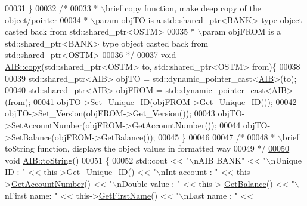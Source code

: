 \begin{DoxyCode}
00031 \}
00032 \textcolor{comment}{/*}
00033 \textcolor{comment}{ * \(\backslash\)brief copy function, make deep copy of the object/pointer}
00034 \textcolor{comment}{ * \(\backslash\)param objTO is a std::shared\_ptr<BANK> type object casted back from std::shared\_ptr<OSTM>}
00035 \textcolor{comment}{ * \(\backslash\)param objFROM is a std::shared\_ptr<BANK> type object casted back from std::shared\_ptr<OSTM>}
00036 \textcolor{comment}{ */}
\hypertarget{_a_i_b_8cpp_source.tex_l00037}{}\hyperlink{class_a_i_b_ad76f25ce86cb42028440f41c371903e0_ad76f25ce86cb42028440f41c371903e0}{00037} \textcolor{keywordtype}{void} \hyperlink{class_a_i_b_ad76f25ce86cb42028440f41c371903e0_ad76f25ce86cb42028440f41c371903e0}{AIB::copy}(std::shared\_ptr<OSTM> to, std::shared\_ptr<OSTM> from)\{
00038 
00039     std::shared\_ptr<AIB> objTO = std::dynamic\_pointer\_cast<\hyperlink{class_a_i_b}{AIB}>(to);
00040     std::shared\_ptr<AIB> objFROM = std::dynamic\_pointer\_cast<\hyperlink{class_a_i_b}{AIB}>(from);
00041     objTO->\hyperlink{class_o_s_t_m_ab5019a32185631c08abbf826422f2d93_ab5019a32185631c08abbf826422f2d93}{Set\_Unique\_ID}(objFROM->Get\_Unique\_ID());
00042     objTO->Set\_Version(objFROM->Get\_Version());
00043     objTO->SetAccountNumber(objFROM->GetAccountNumber());
00044     objTO->SetBalance(objFROM->GetBalance());
00045 \}
00046 
00047 \textcolor{comment}{/*}
00048 \textcolor{comment}{ *  \(\backslash\)brief toString function, displays the object values in formatted way}
00049 \textcolor{comment}{ */}
\hypertarget{_a_i_b_8cpp_source.tex_l00050}{}\hyperlink{class_a_i_b_aff0f0a0db75a17efec4bd500b888232d_aff0f0a0db75a17efec4bd500b888232d}{00050} \textcolor{keywordtype}{void} \hyperlink{class_a_i_b_aff0f0a0db75a17efec4bd500b888232d_aff0f0a0db75a17efec4bd500b888232d}{AIB::toString}()
00051 \{
00052     std::cout << \textcolor{stringliteral}{"\(\backslash\)nAIB BANK"} << \textcolor{stringliteral}{"\(\backslash\)nUnique ID : "} << this->\hyperlink{class_o_s_t_m_a5a01a8b98d16b1d1904ecf9356e7b71d_a5a01a8b98d16b1d1904ecf9356e7b71d}{Get\_Unique\_ID}() << \textcolor{stringliteral}{"\(\backslash\)nInt account :
       "} << this->\hyperlink{class_a_i_b_aef34bfbf20d767114e05b8b532cab777_aef34bfbf20d767114e05b8b532cab777}{GetAccountNumber}() << \textcolor{stringliteral}{"\(\backslash\)nDouble value : "} << this->
      \hyperlink{class_a_i_b_ac75087ae73c308bd946e47a71dc85b86_ac75087ae73c308bd946e47a71dc85b86}{GetBalance}() << \textcolor{stringliteral}{"\(\backslash\)nFirst name: "} << this->\hyperlink{class_a_i_b_aa0833919c1c211481560cd88cb5b381b_aa0833919c1c211481560cd88cb5b381b}{GetFirstName}() << \textcolor{stringliteral}{"\(\backslash\)nLast name : "} << 

\end{DoxyCode}
